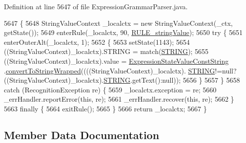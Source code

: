 Definition at line 5647 of file Expression\+Grammar\+Parser.\+java.


\begin{DoxyCode}
5647                                                                             \{
5648     StringValueContext \_localctx = \textcolor{keyword}{new} StringValueContext(\_ctx, getState());
5649     enterRule(\_localctx, 90, \hyperlink{classgov_1_1nasa_1_1jpf_1_1inspector_1_1server_1_1expression_1_1parser_1_1_expression_grammar_parser_a32a1c33d369a2e4ffbc3534a15b425d1}{RULE\_stringValue});
5650     \textcolor{keywordflow}{try} \{
5651       enterOuterAlt(\_localctx, 1);
5652       \{
5653       setState(1143);
5654       ((StringValueContext)\_localctx).STRING = match(\hyperlink{classgov_1_1nasa_1_1jpf_1_1inspector_1_1server_1_1expression_1_1parser_1_1_expression_grammar_parser_ad80dacdbb6cc17d04d47e898656647e2}{STRING});
5655        ((StringValueContext)\_localctx).value =  \hyperlink{classgov_1_1nasa_1_1jpf_1_1inspector_1_1server_1_1expression_1_1expressions_1_1_expression_state_value_const_string}{ExpressionStateValueConstString}
      .\hyperlink{classgov_1_1nasa_1_1jpf_1_1inspector_1_1server_1_1expression_1_1expressions_1_1_expression_state_value_const_string_a3559714b6521a9fa35801a193809d1cd}{convertToStringWrapped}((((StringValueContext)\_localctx).
      \hyperlink{classgov_1_1nasa_1_1jpf_1_1inspector_1_1server_1_1expression_1_1parser_1_1_expression_grammar_parser_ad80dacdbb6cc17d04d47e898656647e2}{STRING}!=null?((StringValueContext)\_localctx).\hyperlink{classgov_1_1nasa_1_1jpf_1_1inspector_1_1server_1_1expression_1_1parser_1_1_expression_grammar_parser_ad80dacdbb6cc17d04d47e898656647e2}{STRING}.getText():null)); 
5656       \}
5657     \}
5658     \textcolor{keywordflow}{catch} (RecognitionException re) \{
5659       \_localctx.exception = re;
5660       \_errHandler.reportError(\textcolor{keyword}{this}, re);
5661       \_errHandler.recover(\textcolor{keyword}{this}, re);
5662     \}
5663     \textcolor{keywordflow}{finally} \{
5664       exitRule();
5665     \}
5666     \textcolor{keywordflow}{return} \_localctx;
5667   \}
\end{DoxyCode}


\subsection{Member Data Documentation}
